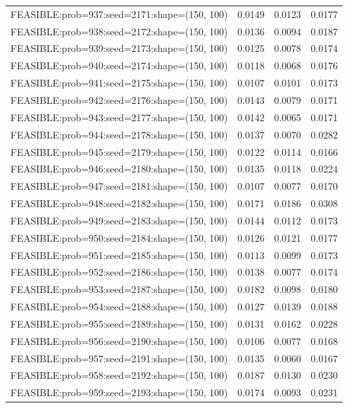 \begin{longtable}{lccc}
FEASIBLE:prob=937:seed=2171:shape=(150, 100) &   0.0149 & 0.0123 & 0.0177 \\
FEASIBLE:prob=938:seed=2172:shape=(150, 100) &   0.0136 & 0.0094 & 0.0187 \\
FEASIBLE:prob=939:seed=2173:shape=(150, 100) &   0.0125 & 0.0078 & 0.0174 \\
FEASIBLE:prob=940:seed=2174:shape=(150, 100) &   0.0118 & 0.0068 & 0.0176 \\
FEASIBLE:prob=941:seed=2175:shape=(150, 100) &   0.0107 & 0.0101 & 0.0173 \\
FEASIBLE:prob=942:seed=2176:shape=(150, 100) &   0.0143 & 0.0079 & 0.0171 \\
FEASIBLE:prob=943:seed=2177:shape=(150, 100) &   0.0142 & 0.0065 & 0.0171 \\
FEASIBLE:prob=944:seed=2178:shape=(150, 100) &   0.0137 & 0.0070 & 0.0282 \\
FEASIBLE:prob=945:seed=2179:shape=(150, 100) &   0.0122 & 0.0114 & 0.0166 \\
FEASIBLE:prob=946:seed=2180:shape=(150, 100) &   0.0135 & 0.0118 & 0.0224 \\
FEASIBLE:prob=947:seed=2181:shape=(150, 100) &   0.0107 & 0.0077 & 0.0170 \\
FEASIBLE:prob=948:seed=2182:shape=(150, 100) &   0.0171 & 0.0186 & 0.0308 \\
FEASIBLE:prob=949:seed=2183:shape=(150, 100) &   0.0144 & 0.0112 & 0.0173 \\
FEASIBLE:prob=950:seed=2184:shape=(150, 100) &   0.0126 & 0.0121 & 0.0177 \\
FEASIBLE:prob=951:seed=2185:shape=(150, 100) &   0.0113 & 0.0099 & 0.0173 \\
FEASIBLE:prob=952:seed=2186:shape=(150, 100) &   0.0138 & 0.0077 & 0.0174 \\
FEASIBLE:prob=953:seed=2187:shape=(150, 100) &   0.0182 & 0.0098 & 0.0180 \\
FEASIBLE:prob=954:seed=2188:shape=(150, 100) &   0.0127 & 0.0139 & 0.0188 \\
FEASIBLE:prob=955:seed=2189:shape=(150, 100) &   0.0131 & 0.0162 & 0.0228 \\
FEASIBLE:prob=956:seed=2190:shape=(150, 100) &   0.0106 & 0.0077 & 0.0168 \\
FEASIBLE:prob=957:seed=2191:shape=(150, 100) &   0.0135 & 0.0060 & 0.0167 \\
FEASIBLE:prob=958:seed=2192:shape=(150, 100) &   0.0187 & 0.0130 & 0.0230 \\
FEASIBLE:prob=959:seed=2193:shape=(150, 100) &   0.0174 & 0.0093 & 0.0231 \\

\end{longtable}
